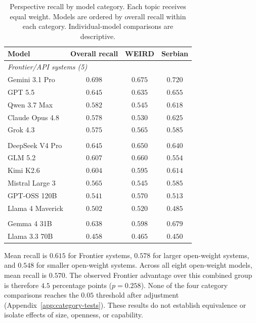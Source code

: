 \documentclass[11pt,a4paper]{article}
\begin{document}
\begin{table}[!t]
\centering
\small
\caption{Perspective recall by model category. Each topic receives equal weight. Models are ordered by overall recall within each category. Individual-model comparisons are descriptive.}
\label{tab:model-recall}
\begin{tabular}{lccc}
\toprule
Model & Overall recall & WEIRD & Serbian \\
\midrule
\multicolumn{4}{l}{\textit{Frontier/API systems (5)}}\\
Gemini 3.1 Pro & $0.698$ & $0.675$ & $0.720$\\
GPT 5.5 & $0.645$ & $0.635$ & $0.655$\\
Qwen 3.7 Max & $0.582$ & $0.545$ & $0.618$\\
Claude Opus 4.8 & $0.578$ & $0.530$ & $0.625$\\
Grok 4.3 & $0.575$ & $0.565$ & $0.585$\\
\addlinespace
\multicolumn{4}{l}{\textit{Larger open-weight systems (6)}}\\
DeepSeek V4 Pro & $0.645$ & $0.650$ & $0.640$\\
GLM 5.2 & $0.607$ & $0.660$ & $0.554$\\
Kimi K2.6 & $0.604$ & $0.595$ & $0.614$\\
Mistral Large 3 & $0.565$ & $0.545$ & $0.585$\\
GPT-OSS 120B & $0.541$ & $0.570$ & $0.513$\\
Llama 4 Maverick & $0.502$ & $0.520$ & $0.485$\\
\addlinespace
\multicolumn{4}{l}{\textit{Smaller open-weight systems (2)}}\\
Gemma 4 31B & $0.638$ & $0.598$ & $0.679$\\
Llama 3.3 70B & $0.458$ & $0.465$ & $0.450$\\
\bottomrule
\end{tabular}
\end{table}

Mean recall is $0.615$ for Frontier systems, $0.578$ for larger open-weight systems, and $0.548$ for smaller open-weight systems. Across all eight open-weight models, mean recall is $0.570$. The observed Frontier advantage over this combined group is therefore $4.5$ percentage points ($p=0.258$). None of the four category comparisons reaches the $0.05$ threshold after adjustment (Appendix~\ref{app:category-tests}). These results do not establish equivalence or isolate effects of size, openness, or capability.
\end{document}
